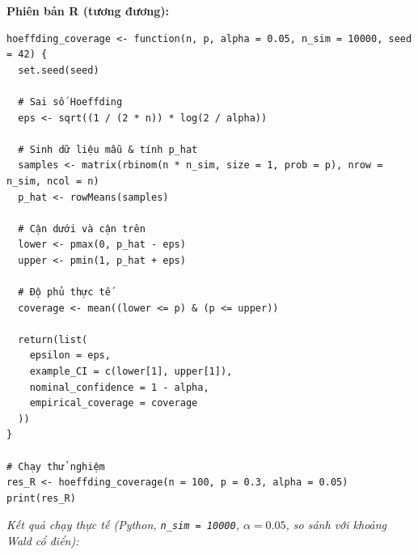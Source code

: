 \documentclass[12pt,a4paper]{article}
\begin{document}
\textbf{Phiên bản R (tương đương):}

\begin{verbatim}
hoeffding_coverage <- function(n, p, alpha = 0.05, n_sim = 10000, seed = 42) {
  set.seed(seed)
  
  # Sai số Hoeffding
  eps <- sqrt((1 / (2 * n)) * log(2 / alpha))
  
  # Sinh dữ liệu mẫu & tính p_hat
  samples <- matrix(rbinom(n * n_sim, size = 1, prob = p), nrow = n_sim, ncol = n)
  p_hat <- rowMeans(samples)
  
  # Cận dưới và cận trên
  lower <- pmax(0, p_hat - eps)
  upper <- pmin(1, p_hat + eps)
  
  # Độ phủ thực tế
  coverage <- mean((lower <= p) & (p <= upper))
  
  return(list(
    epsilon = eps,
    example_CI = c(lower[1], upper[1]),
    nominal_confidence = 1 - alpha,
    empirical_coverage = coverage
  ))
}

# Chạy thử nghiệm
res_R <- hoeffding_coverage(n = 100, p = 0.3, alpha = 0.05)
print(res_R)
\end{verbatim}

\emph{Kết quả chạy thực tế (Python, \texttt{n\_sim\ =\ 10000}, \(\alpha = 0.05\), so sánh với khoảng Wald cổ điển):}
\end{document}
